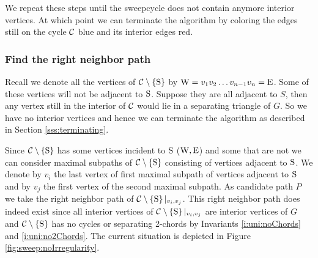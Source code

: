 We repeat these steps until the sweepcycle does not contain anymore interior vertices. At which point we can terminate the algorithm by coloring the edges still on the cycle $\mathcal{C}$ blue and its interior edges red.

\subsubsection{Find the right neighbor path}
  Recall we denote all the vertices of $\mathcal{C} \setminus \left\lbrace {\mathrm{S}} \right\rbrace$ by $\mathrm{W} =  v_1   v_2   \ldots v_{n-1}   v_n = \mathrm{E}$.
  Some of these vertices will not be adjacent to $\mathrm{S}$.
  Suppose they are all adjacent to $S$, then any vertex still in the interior of $\mathcal{C}$ would lie in a separating triangle of $G$. So we have no interior vertices and hence we can terminate the algorithm as described in Section \ref{sss:terminating}.

  Since $\mathcal{C} \setminus \left\lbrace {\mathrm{S}} \right\rbrace$ has some vertices incident to $\mathrm{S}$ ($\mathrm{W} , \mathrm{E}$) and some that are not we can consider maximal subpaths of $\mathcal{C} \setminus \left\lbrace {\mathrm{S}} \right\rbrace$ consisting of vertices adjacent to $\mathrm{S}$.
  We denote by $v_i$ the last vertex of first maximal subpath of vertices adjacent to $\mathrm{S}$ and by $v_j$ the first vertex of the second maximal subpath.
  As candidate path $P$ we take the right neighbor path of $\mathcal{C} \setminus \left\lbrace {\mathrm{S}} \right\rbrace|_{v_i, v_j}$. This right neighbor path does indeed exist since all interior vertices of $\mathcal{C} \setminus \left\lbrace {\mathrm{S}} \right\rbrace|_{v_i, v_j}$ are interior vertices of $G$ and $\mathcal{C} \setminus \left\lbrace {\mathrm{S}} \right\rbrace$ has no cycles or separating 2-chords by Invariants \ref{i:uni:noChords} and \ref{i:uni:no2Chords}.
  The current situation is depicted in Figure \ref{fig:sweep:noIrregularity}.

